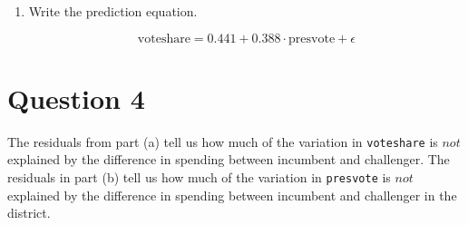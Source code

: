 \documentclass[12pt,letterpaper]{article}
\begin{document}
\begin{enumerate}
				
			\vspace{5cm}
		\item Write the prediction equation.
		
		\begin{equation*}
			\text{voteshare} = 0.441 + 0.388 \cdot \text{presvote} + \epsilon
		\end{equation*}
		
	\end{enumerate}
	

\newpage	
\section*{Question 4}
\noindent The residuals from part (a) tell us how much of the variation in \texttt{voteshare} is $not$ explained by the difference in spending between incumbent and challenger. The residuals in part (b) tell us how much of the variation in \texttt{presvote} is $not$ explained by the difference in spending between incumbent and challenger in the district.
\end{document}
